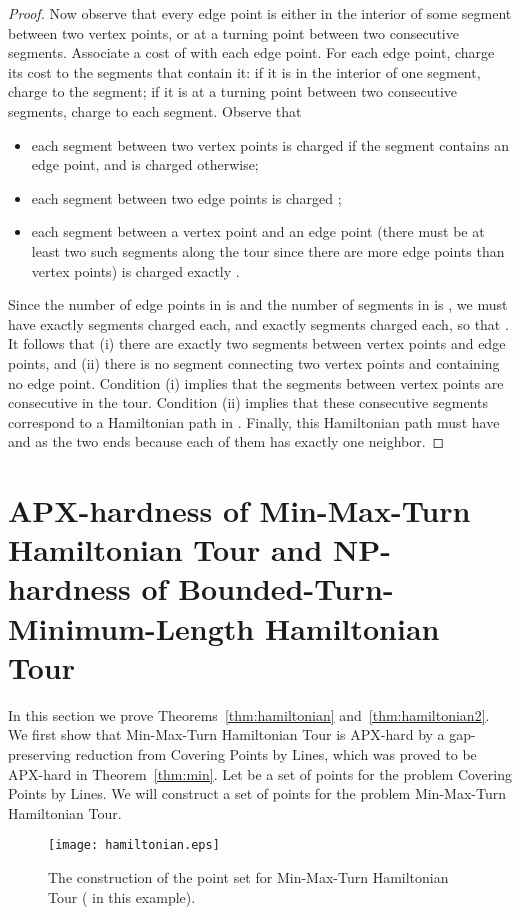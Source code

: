 \documentclass[letterpaper,11pt]{article}
\begin{document}
\begin{proof}
Now observe that every edge point is
either in the interior of some segment between two vertex points,
or at a turning point between two consecutive segments.
Associate a cost of  with each edge point.
For each edge point, charge its cost to the segments that contain it:
if it is in the interior of one segment, charge  to the segment;
if it is at a turning point between two consecutive segments,
charge  to each segment.
Observe that
\begin{itemize} \itemsep -1pt
\item
each segment between two vertex points is charged  if the segment
contains an edge point, and is charged  otherwise;
\item
each segment between two edge points is charged ;
\item
each segment between a vertex point and an edge point
(there must be at least two such segments along the tour
since there are more edge points than vertex points)
is charged exactly .
\end{itemize}
Since the number of edge points in  is 
and the number of segments in  is ,
we must have exactly  segments charged  each,
and exactly  segments charged  each,
so that .
It follows that (i)
there are exactly two segments between vertex points and edge points,
and (ii)
there is no segment connecting two vertex points and containing no edge point.
Condition (i) implies that the segments between vertex points
are consecutive in the tour.
Condition (ii) implies that these consecutive segments correspond to
a Hamiltonian path in .
Finally, this Hamiltonian path must have  and  as the two ends
because each of them has exactly one neighbor.
\end{proof}


\section{APX-hardness of {\sc Min-Max-Turn Hamiltonian Tour}
	and NP-hardness of {\sc Bounded-Turn-Minimum-Length Hamiltonian Tour}}

In this section we prove
Theorems~\ref{thm:hamiltonian} and~\ref{thm:hamiltonian2}.
We first show that {\sc Min-Max-Turn Hamiltonian Tour} is APX-hard
by a gap-preserving reduction from {\sc Covering Points by Lines},
which was proved to be APX-hard in Theorem~\ref{thm:min}.
Let  be a set of  points for the problem {\sc Covering Points by Lines}.
We will construct a set  of points for the problem
{\sc Min-Max-Turn Hamiltonian Tour}.
\begin{figure}[htb]
\centering\texttt{[image: hamiltonian.eps]}
\caption{The construction of the point set  for {\sc Min-Max-Turn Hamiltonian
Tour} ( in this example).}
\label{fig:hamiltonian}
\end{figure}
\end{document}
